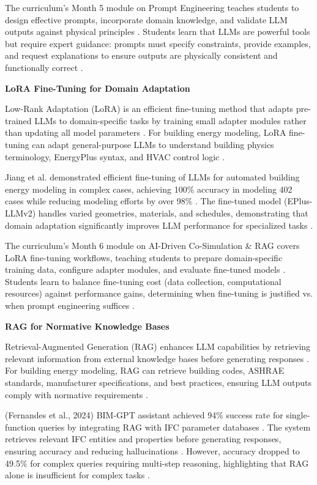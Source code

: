 \documentclass[12pt,a4paper]{article}
\begin{document}
The curriculum's Month 5 module on Prompt Engineering teaches students to design effective prompts, incorporate domain knowledge, and validate LLM outputs against physical principles \cite{ref278}. Students learn that LLMs are powerful tools but require expert guidance: prompts must specify constraints, provide examples, and request explanations to ensure outputs are physically consistent and functionally correct \cite{ref279}.

\textbf{LoRA Fine-Tuning for Domain Adaptation}

Low-Rank Adaptation (LoRA) is an efficient fine-tuning method that adapts pre-trained LLMs to domain-specific tasks by training small adapter modules rather than updating all model parameters \cite{ref280}. For building energy modeling, LoRA fine-tuning can adapt general-purpose LLMs to understand building physics terminology, EnergyPlus syntax, and HVAC control logic \cite{ref281}.

Jiang et al. demonstrated efficient fine-tuning of LLMs for automated building energy modeling in complex cases, achieving 100\% accuracy in modeling 402 cases while reducing modeling efforts by over 98\% \cite{ref282}. The fine-tuned model (EPlus-LLMv2) handles varied geometries, materials, and schedules, demonstrating that domain adaptation significantly improves LLM performance for specialized tasks \cite{ref283}.

The curriculum's Month 6 module on AI-Driven Co-Simulation \& RAG covers LoRA fine-tuning workflows, teaching students to prepare domain-specific training data, configure adapter modules, and evaluate fine-tuned models \cite{ref284}. Students learn to balance fine-tuning cost (data collection, computational resources) against performance gains, determining when fine-tuning is justified vs. when prompt engineering suffices \cite{ref285}.

\textbf{RAG for Normative Knowledge Bases}

Retrieval-Augmented Generation (RAG) enhances LLM capabilities by retrieving relevant information from external knowledge bases before generating responses \cite{ref286}. For building energy modeling, RAG can retrieve building codes, ASHRAE standards, manufacturer specifications, and best practices, ensuring LLM outputs comply with normative requirements \cite{ref287}.

(Fernandes et al., 2024) BIM-GPT assistant achieved 94\% success rate for single-function queries by integrating RAG with IFC parameter databases \cite{ref288}. The system retrieves relevant IFC entities and properties before generating responses, ensuring accuracy and reducing hallucinations \cite{ref289}. However, accuracy dropped to 49.5\% for complex queries requiring multi-step reasoning, highlighting that RAG alone is insufficient for complex tasks \cite{ref290}.
\end{document}
